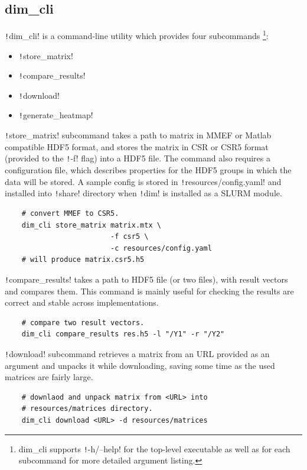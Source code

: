\documentclass[thesis=M,english]{FITthesis}[2019/12/23]
\newcommand{\csre}[1]{\texttt!#1!}
\begin{document}
\subsection{dim\_cli}

\csre{dim_cli} is a command-line utility which provides four subcommands
\footnote{dim\_cli supports \csre{-h/--help} for the top-level executable as well as for each subcommand for more detailed argument listing.}:
\begin{itemize}
    \item \csre{store_matrix}
    \item \csre{compare_results}
    \item \csre{download}
    \item \csre{generate_heatmap}
\end{itemize}

\csre{store_matrix} subcommand takes a path to matrix in MMEF or Matlab compatible HDF5 format, and stores
the matrix in CSR or CSR5 format (provided to the \csre{-f} flag) into a HDF5 file. The command also
requires a configuration file, which describes properties for the HDF5 groups in which the data will be
stored. A sample config is stored in \csre{resources/config.yaml} and installed into \csre{share} directory
when \csre{dim} is installed as a SLURM module.

\begin{verbatim}
    # convert MMEF to CSR5.
    dim_cli store_matrix matrix.mtx \
                         -f csr5 \
                         -c resources/config.yaml
    # will produce matrix.csr5.h5
\end{verbatim}

\csre{compare_results} takes a path to HDF5 file (or two files), with result vectors and compares them.
This command is mainly useful for checking the results are correct and stable across implementations.

\begin{verbatim}
    # compare two result vectors.
    dim_cli compare_results res.h5 -l "/Y1" -r "/Y2"
\end{verbatim}

\csre{download} subcommand retrieves a matrix from an URL provided as an argument and unpacks it while
downloading, saving some time as the used matrices are fairly large.

\begin{verbatim}
    # downlaod and unpack matrix from <URL> into 
    # resources/matrices directory.
    dim_cli download <URL> -d resources/matrices
\end{verbatim}
\end{document}
